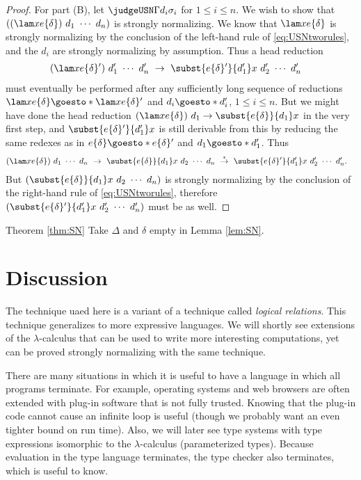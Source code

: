 \begin{proof}
For part (B), let $\judgeUSN\Gamma{d_i}{\sigma_i}$ for $1\leq i\leq n$. We wish to show that $((\lam x{\osubst e\delta})~d_1~\cdots~d_n)$ is strongly normalizing. We know that $\lam x{\osubst e\delta}$ is strongly normalizing by the conclusion of the left-hand rule of \eqref{eq:USNtworules}, and the $d_i$ are strongly normalizing by assumption. Thus a head reduction
\begin{align*}
(\lam x{\osubst e\delta'})~d_1'~\cdots~d_n'\ &\to\ \subst{\osubst e\delta'}{d_1'}x~d_2'~\cdots~d_n'
\end{align*}
must eventually be performed after any sufficiently long sequence of reductions $\lam x{\osubst e\delta} \goesto*{} \lam x{\osubst e\delta'}$ and $d_i \goesto*{} d_i'$, $1\leq i\leq n$.
But we might have done the head reduction $(\lam x{\osubst e\delta})~d_1 \to \subst{\osubst e\delta}{d_1}x$ in the very first step, and $\subst{\osubst e\delta'}{d_1'}x$ is still derivable from this by reducing the same redexes as in $\osubst e\delta\goesto*{}\osubst e\delta'$ and $d_1\goesto*{}d_1'$. Thus
\begin{align*}
(\lam x{\osubst e\delta})~d_1~\cdots~d_n\ &\to\ \subst{\osubst e\delta}{d_1}x~d_2~\cdots~d_n\ \stackrel *\to\ \subst{\osubst e\delta'}{d_1'}x~d_2'~\cdots~d_n'.
\end{align*}
But $(\subst{\osubst e\delta}{d_1}x~d_2~\cdots~d_n)$ is strongly normalizing by the conclusion of the right-hand rule of \eqref{eq:USNtworules}, therefore $(\subst{\osubst e\delta'}{d_1'}x~d_2'~\cdots~d_n')$ must be as well.
\end{proof}

\begin{proofof}{Theorem \ref{thm:SN}}
Take $\Delta$ and $\delta$ empty in Lemma \ref{lem:SN}.
\end{proofof}

\section{Discussion}

The technique uaed here is a variant of a technique called \emph{logical relations}. This technique generalizes to more expressive languages. We will shortly see extensions of the $\lambda$-calculus that can be used to write more interesting computations, yet can be proved strongly normalizing with the same technique.

There are many situations in which it is useful to have a language in which all programs terminate. For example, operating systems and web browsers are often extended with plug-in software that is not fully trusted. Knowing that the plug-in code cannot cause an infinite loop is useful (though we probably want an even tighter bound on run time). Also, we will later see type systems with type expressions isomorphic to the $\lambda$-calculus (parameterized types). Because evaluation in the type language terminates, the type checker also terminates, which is useful to know.

